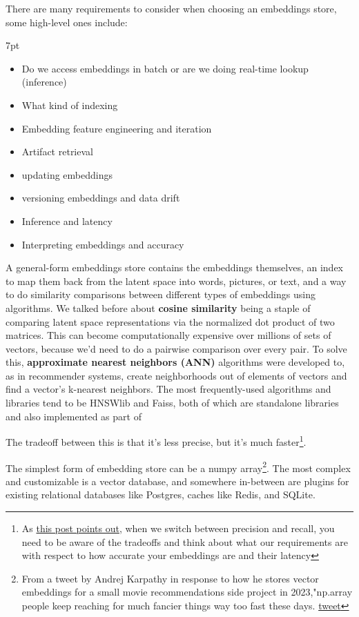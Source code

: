 \documentclass[11pt, table]{diazessay} %
\newenvironment{formal}{%
  \def\FrameCommand{%
    \hspace{1pt}%
    {\color{w_lightblue}\vrule width 2pt}%
    {\color{formalshade}\vrule width 4pt}%
    \colorbox{formalshade}%
  }%
  \MakeFramed{\advance\hsize-\width\FrameRestore}%
  \noindent\hspace{-4.55pt}%
  \begin{adjustwidth}{}{7pt}%
  \vspace{2pt}\vspace{2pt}%
}
{%
  \vspace{2pt}\end{adjustwidth}\endMakeFramed%
}
\begin{document}
\begin{sloppypar}
There are many requirements to consider when choosing an embeddings store, some high-level ones include: 

\begin{formal}
\begin{itemize}
  \item Do we access embeddings in batch or are we doing real-time lookup (inference)
  \item What kind of indexing 
  \item Embedding feature engineering and iteration
  \item Artifact retrieval
  \item updating embeddings 
  \item versioning embeddings and data drift
  \item Inference and latency
  \item Interpreting embeddings and accuracy
\end{itemize}
\end{formal}

A general-form embeddings store contains the embeddings themselves, an index to map them back from the latent space into words, pictures, or text, and a way to do similarity comparisons between different types of embeddings using algorithms. We talked before about \textbf{cosine similarity} being a staple of comparing latent space representations via the normalized dot product of two matrices. This can become computationally expensive over millions of sets of vectors, because we'd need to do a pairwise comparison over every pair. To solve this, \textbf{approximate nearest neighbors (ANN)} algorithms were developed to, as in recommender systems, create neighborhoods out of elements of vectors and find a vector's k-nearest neighbors. The most frequently-used algorithms and libraries tend to be HNSWlib and Faiss, both of which are standalone libraries and also implemented as part of 

The tradeoff between this is that it's less precise, but it's much faster\footnote{As  \href{https://bergum.medium.com/four-mistakes-when-introducing-embeddings-and-vector-search-d39478a568c5}{this post points out}, when we switch between precision and recall, you need to be aware of the tradeoffs and think about what our requirements are with respect to how accurate your embeddings are and their latency}. 

The simplest form of embedding store can be a numpy array\footnote{From a tweet by Andrej Karpathy in response to how he stores vector embeddings for a small movie recommendations side project in 2023,"np.array people keep reaching for much fancier things way too fast these days. \href{https://twitter.com/karpathy/status/1647374645316968449}{tweet}}. The most complex and customizable is a vector database, and somewhere in-between are plugins for existing relational databases like Postgres, caches like Redis, and SQLite. 


\end{sloppypar}
\end{document}
